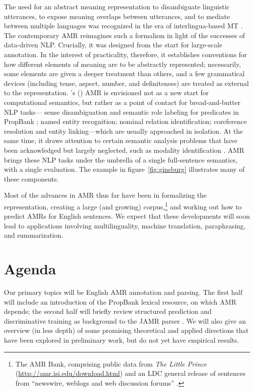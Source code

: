 \documentclass[11pt,letterpaper]{article}
\newcommand{\fref}[1]{figure~\ref{#1}}
\newcommand{\Citeposs}[2][]{\Citeauthor{#2}'s (\citeyear[#1]{#2})}
\begin{document}
The need for an abstract meaning representation to disambiguate linguistic utterances, 
to expose meaning overlaps between utterances, and to mediate between multiple languages 
was recognized in the era of interlingua-based MT \citep{dorr-98}. 
The contemporary AMR reimagines such a formalism in light of the successes of data-driven NLP.
Crucially, it was designed from the start for large-scale annotation. 
In the interest of practicality, therefore, it establishes conventions for how different elements 
of meaning are to be abstractly represented; necessarily, some elements are given a deeper treatment 
than others, and a few grammatical devices (including tense, aspect, number, and definiteness) 
are treated as external to the representation.
\Citeposs{amr} AMR is envisioned not as a new start for computational semantics, 
but rather as a point of contact for bread-and-butter NLP tasks---%
sense disambiguation and semantic role labeling for predicates in PropBank \citep{propbank,bonial-14}; 
named entity recognition; nominal relation identification; 
coreference resolution and entity linking---which are usually approached in isolation. 
At the same time, it draws attention to certain semantic analysis problems that have been 
acknowledged but largely neglected, such as modality identification \citep{prabhakaran-12}.
AMR brings these NLP tasks under the umbrella of a single full-sentence semantics, 
with a single evaluation. The example in \fref{fig:ginsburg} illustrates many of these components.

Most of the advances in AMR thus far have been in formalizing the representation, 
creating a large (and growing) corpus,\footnote{The AMR Bank, comprising 
public data from \textit{The Little Prince} (\url{http://amr.isi.edu/download.html}) 
and an LDC general release of sentences from ``newswire, weblogs and web discussion forums'' \citep{amr-ldc}.} 
and working out how to predict AMRs for English sentences. 
We expect that these developments will soon lead to applications 
involving multilinguality, machine translation, paraphrasing, and summarization.



\section{Agenda}

Our primary topics will be English AMR annotation and parsing. 
The first half will include an introduction of the PropBank lexical resource, on which AMR depends; 
the second half will briefly review structured prediction and discriminative training 
as background to the JAMR parser \citep{flanigan-14}.
We will also give an overview (in less depth) of some promising theoretical and applied directions 
that have been explored in preliminary work, but do not yet have empirical results.
\end{document}
